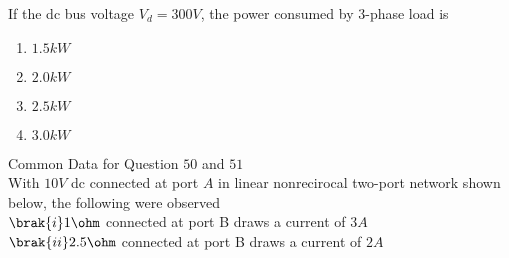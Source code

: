 \item If the dc bus voltage $V_{d}=300 V$, the power consumed by $3$-phase load is
\begin{enumerate}
    \item$1.5 kW$\\
    \item$2.0 kW$\\
    \item$2.5 kW$\\
    \item$3.0 kW$
\end{enumerate}
       Common Data for Question $50$ and $51$\\
         With $10 V$ dc connected at port $A$ in linear nonrecirocal two-port network shown below, the following were observed\\
         $\brak{i}1\ohm$ connected at port B draws a current of $3 A$\\
           $\brak{ii}2.5\ohm$ connected at port B draws a current of $2 A$\\
           
